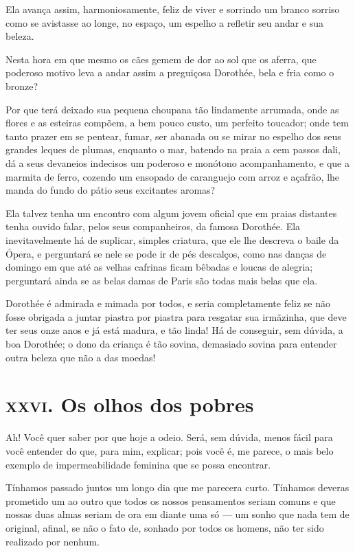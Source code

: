 Ela avança assim, harmoniosamente, feliz de viver e sorrindo um branco
sorriso como se avistasse ao longe, no espaço, um espelho a refletir
seu andar e sua beleza.

Nesta hora em que mesmo os cães gemem de dor ao sol que os aferra,
que poderoso motivo leva a andar assim a preguiçosa Dorothée, bela e fria
como o bronze?

Por que terá deixado sua pequena choupana tão lindamente arrumada, onde
as flores e as esteiras compõem, a bem pouco custo, um perfeito
toucador; onde tem tanto prazer em se pentear, fumar, ser
abanada ou se  mirar no espelho dos seus grandes leques de plumas,
enquanto o mar, batendo na praia a cem passos dali, dá a seus devaneios
indecisos um poderoso e monótono acompanhamento, e que a marmita de
ferro, cozendo um ensopado de caranguejo com arroz e açafrão, lhe
manda do fundo do pátio seus excitantes aromas?

Ela talvez tenha um encontro com algum jovem oficial que em praias
distantes tenha ouvido falar, pelos seus companheiros, da famosa
Dorothée. Ela inevitavelmente há de suplicar, simples
criatura, que ele lhe descreva o baile da Ópera, e perguntará se
nele se pode ir de pés descalços, como nas danças de domingo em
que até as velhas cafrinas ficam bêbadas e loucas de alegria;
perguntará ainda se as belas damas de Paris são todas mais belas que
ela.



Dorothée é admirada e mimada por todos, e seria completamente feliz se
não fosse obrigada a juntar piastra por piastra para resgatar sua
irmãzinha, que deve ter seus onze anos e já está madura, e tão
linda! Há de conseguir, sem dúvida, a boa Dorothée; o dono da criança é
tão sovina, demasiado sovina para entender outra beleza que não a das
moedas!

\chapter{\textsc{xxvi.} Os olhos dos pobres}

Ah! Você quer saber por que hoje a odeio. Será, sem dúvida, menos fácil
para você entender do que, para mim, explicar; pois você é, me
parece, o mais belo exemplo de impermeabilidade feminina que se possa
encontrar.

Tínhamos passado juntos um longo dia que me parecera curto. Tínhamos
deveras prometido um ao outro que todos os nossos pensamentos seriam
comuns e que nossas duas almas seriam de ora em diante uma só ---
um sonho que nada tem de original, afinal, se não o fato de, sonhado 
por todos os homens, não ter sido realizado por nenhum.

